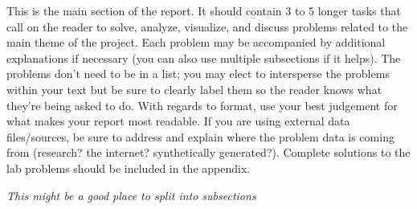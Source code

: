 This is the main section of the report. It should contain 3 to 5 longer tasks that call on the reader to solve, analyze, visualize, and discuss problems related to the main theme of the project. Each problem may be accompanied by additional explanations if necessary (you can also use multiple subsections if it helps). The problems don’t need to be in a list; you may elect to intersperse the problems within your text but be sure to clearly label them so the reader knows what they’re being asked to do. With regards to format, use your best judgement for what makes your report most readable. If you are using external data files/sources, be sure to address and explain where the problem data is coming from (research? the internet? synthetically generated?). Complete solutions to the lab problems should be included in the appendix.

\textit{This might be a good place to split into subsections}